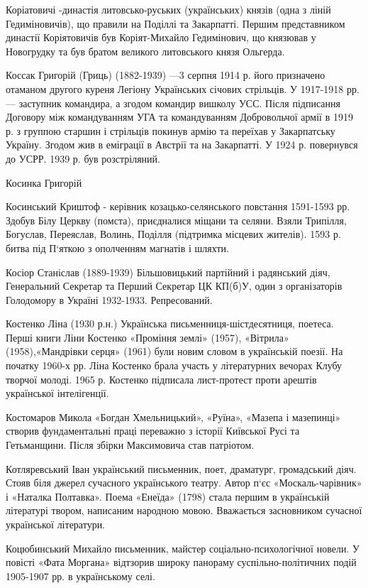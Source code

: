 Коріатовичі -династія литовсько-руських (українських) князів (одна з ліній Гедиміновичів), що правили на Поділлі та Закарпатті. Першим представником династії Коріятовичів був Коріят-Михайло Гедимінович, що князював у Новогрудку та був братом великого литовського князя Ольгерда.

Коссак Григорій (Гриць) (1882-1939) —3 серпня 1914 р. його призначено отаманом другого куреня Легіону Українських січових стрільців. У 1917-1918 рр. --- заступник командира, а згодом командир вишколу УСС. Після підписання Договору між командуванням УГА та командуванням Добровольчої армії в 1919 р. з группою старшин і стрільців покинув армію та переїхав у Закарпатську Україну. Згодом жив в еміграції в Австрії та на Закарпатті. У 1924 р. повернувся до УСРР. 1939 р. був розстріляний.

Косинка Григорій 

Косинський Криштоф  - керівник козацько-селянського повстання 1591-1593 рр. Здобув Білу Церкву (помста), приєдналися міщани та селяни. Взяли Трипілля, Богуслав, Переяслав, Волинь, Поділля (підтримка місцевих жителів). 1593 р. битва під П‘яткою з ополченням магнатів і шляхти.

Косіор Станіслав (1889-1939) Більшовицький партійний і радянський діяч, Генеральний Секретар та Перший Секретар ЦК КП(б)У, один з організаторів Голодомору в Україні 1932-1933. Репресований.

Костенко Ліна (1930 р.н.) Українська письменниця-шістдесятниця, поетеса. Перші книги Ліни Костенко «Проміння землі» (1957), «Вітрила» (1958),«Мандрівки серця» (1961) були новим словом в українській поезії. На початку 1960-х рр. Ліна Костенко брала участь у літературних вечорах Клубу творчої молоді. 1965 р. Костенко підписала лист-протест проти арештів української інтелігенції.

Костомаров Микола «Богдан Хмельницький», «Руїна», «Мазепа і мазепинці» створив фундаментальні праці переважно з історії Київської Русі та Гетьманщини. Після збірки Максимовича став патріотом.

Котляревський  Іван український письменник, поет, драматург, громадський діяч. Стояв біля джерел сучасного українського театру. Автор п‘єс «Москаль-чарівник» і «Наталка Полтавка». Поема «Енеїда» (1798) стала першим в українській літературі твором, написаним народною мовою. Вважається засновником сучасної української літератури.

Коцюбинський Михайло письменник, майстер соціально-психологічної новели. У повісті «Фата Моргана» відтзорив широку панораму суспільно-політичних подій 1905-1907 рр. в українському селі.

